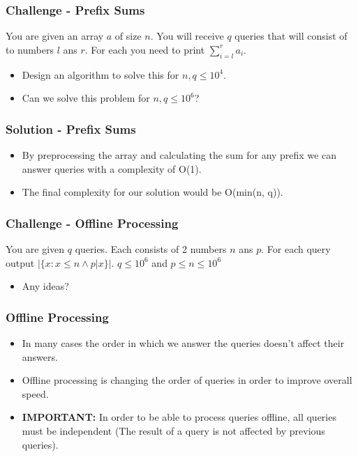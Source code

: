 \documentclass{beamer}
\begin{document}
\begin{frame}
	\frametitle{Challenge - Prefix Sums}

	You are given an array $a$ of size $n$. You will receive $q$ queries that will consist of to numbers $l$ ans $r$. For each you need to print $\sum\limits_{i = l}^{r}a_i$.

	\begin{itemize}
		\item<1-> Design an algorithm to solve this for $n,q \leq 10^4$.
		\item<2-> Can we solve this problem for $n,q \leq 10^6$?
	\end{itemize}
\end{frame}

\begin{frame}[fragile]
	\frametitle{Solution - Prefix Sums}

	\begin{itemize}
		\item By preprocessing the array and calculating the sum for any prefix we can answer queries with a complexity of O(1). 
		\item The final complexity for our solution would be O(min(n, q)).
	\end{itemize}

	
\end{frame}

\begin{frame}
	\frametitle{Challenge - Offline Processing}

	You are given $q$ queries. Each consists of 2 numbers $n$ ans $p$. For each query output $|\{x : x \leq n \wedge p|x\}|$. $q \leq 10^6$ and $p \leq n \leq 10^6$

	\begin{itemize}
		\item Any ideas?
	\end{itemize}
\end{frame}

\begin{frame}
	\frametitle{Offline Processing}

	\begin{itemize}
		\item In many cases the order in which we answer the queries doesn't affect their answers.
		\item Offline processing is changing the order of queries in order to improve overall speed.
		\item \textbf{IMPORTANT:} In order to be able to process queries offline, all queries must be independent (The result of a query is not affected by previous queries).
	\end{itemize}
\end{frame}
\end{document}
